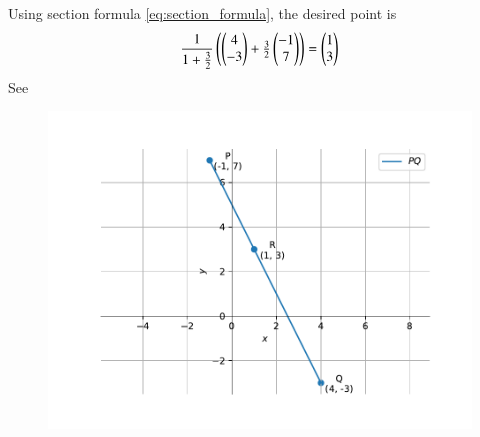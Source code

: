 Using section formula \eqref{eq:section_formula}, the desired point is
\begin{align}
\frac{1}{1+\frac{3}{2}}  \begin{pmatrix}\begin{pmatrix}
4\\
-3
\end{pmatrix}
  +
   \frac{3}{2}\begin{pmatrix}
-1\\
7
\end{pmatrix}\end{pmatrix}
=\begin{pmatrix}
1\\
3
\end{pmatrix}
\end{align}
See 
\begin{figure}[H]
\begin{center}
   \includegraphics[width=0.75\columnwidth]{chapters/10/7/2/1/figs/fig.pdf}
\end{center}
\caption{}
\label{fig:chapters/10/7/2/1/Fig}
\end{figure}

